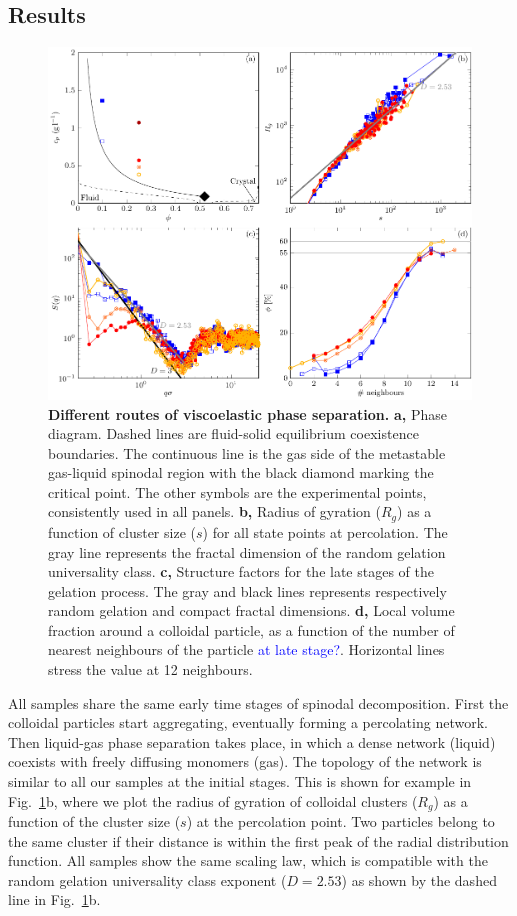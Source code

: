 \documentclass[twocolumn,showpacs,amsmath,amssymb,pre,superscriptaddress]{revtex4}
\begin{document}
\subsection*{Results}


\begin{figure}[!t]
 \centering
 \includegraphics{./fig/phase_separation.pdf}
 \caption{{\bf Different routes of viscoelastic phase separation.}
 \textbf{a,} Phase diagram. Dashed lines are fluid-solid equilibrium coexistence boundaries. The continuous line is the gas side of the metastable gas-liquid spinodal region with the black diamond marking the critical point. The other symbols are the experimental points, consistently used in all panels.
 \textbf{b,} Radius of gyration ($R_g$) as a function of cluster size ($s$) for all state points at percolation. The
 gray line represents the fractal dimension of the random gelation universality class.
 \textbf{c,} Structure factors for the late stages of the gelation process. The gray and black lines represents respectively random gelation and compact fractal dimensions.
 \textbf{d,} Local volume fraction around a colloidal particle, as a function of the number of nearest neighbours of the particle \textcolor{blue}{at late stage?}. Horizontal lines stress the value at 12 neighbours.
 }
 \label{fig:phase_separation}
\end{figure}

All samples share the same early time stages of spinodal decomposition. First the colloidal particles start aggregating,
eventually forming a percolating network. Then liquid-gas phase separation takes place, in which a dense network (liquid)
coexists with freely diffusing monomers (gas). The topology of the network is similar to all our samples at the initial stages.
This is shown for example in Fig.~\ref{fig:phase_separation}b, where we plot the radius of gyration of colloidal clusters ($R_g$)
as a function of the cluster size ($s$) at the percolation point. Two particles belong to the same cluster if their distance is
within the first peak of the radial distribution function. All samples show the same scaling law, which is compatible with
the random gelation universality class exponent ($D=2.53$) as shown by the dashed line in Fig.~\ref{fig:phase_separation}b.
\end{document}
